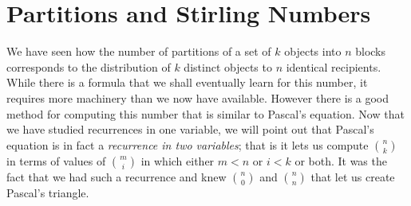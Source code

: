 \documentclass[10pt,]{book}
\theoremstyle{plain}
\theoremstyle{definition}
\theoremstyle{definition}
\numberwithin{equation}{chapter}
\newcommand{\lt}{<}
\begin{document}
\section[{Partitions and Stirling Numbers}]{Partitions and Stirling Numbers}\label{s3-2-partitions}
We have seen how the number of partitions of a set of \(k\) objects into \(n\) blocks corresponds to the distribution of \(k\) distinct objects to \(n\) identical recipients. While there is a formula that we shall eventually learn for this number, it requires more machinery than we now have available. However there is a good method for computing this number that is similar to Pascal's equation. Now that we have studied recurrences in one variable, we will point out that Pascal's equation is in fact a \emph{recurrence in two variables}; that is it lets us compute \(\binom{n}{k}\) in terms of values of \(\binom{m}{i}\) in which either \(m\lt n\) or \(i\lt k\) or both. It was the fact that we had such a recurrence and knew \(\binom{n}{0}\) and \(\binom{n}{n}\) that let us create Pascal's triangle.%
\typeout{************************************************}
\typeout{************************************************}
\end{document}
